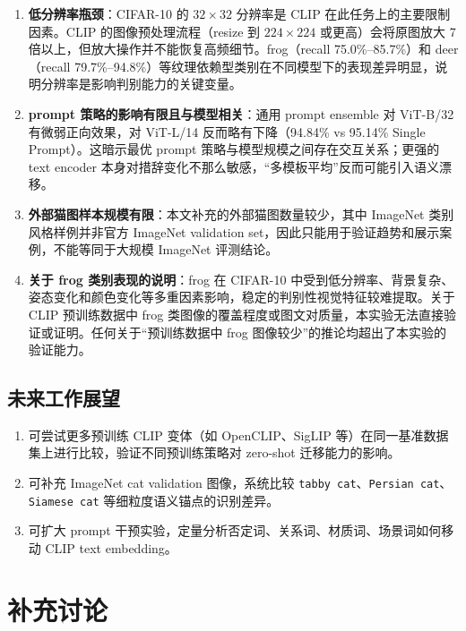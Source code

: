 \documentclass[12pt,a4paper]{ctexart}
\begin{document}
\begin{enumerate}
    \item \textbf{低分辨率瓶颈}：CIFAR-10 的 $32\times32$ 分辨率是 CLIP 在此任务上的主要限制因素。CLIP 的图像预处理流程（resize 到 $224\times224$ 或更高）会将原图放大 7 倍以上，但放大操作并不能恢复高频细节。frog（recall 75.0\%–85.7\%）和 deer（recall 79.7\%–94.8\%）等纹理依赖型类别在不同模型下的表现差异明显，说明分辨率是影响判别能力的关键变量。
    \item \textbf{prompt 策略的影响有限且与模型相关}：通用 prompt ensemble 对 ViT-B/32 有微弱正向效果，对 ViT-L/14 反而略有下降（94.84\% vs 95.14\% Single Prompt）。这暗示最优 prompt 策略与模型规模之间存在交互关系；更强的 text encoder 本身对措辞变化不那么敏感，“多模板平均”反而可能引入语义漂移。
    \item \textbf{外部猫图样本规模有限}：本文补充的外部猫图数量较少，其中 ImageNet 类别风格样例并非官方 ImageNet validation set，因此只能用于验证趋势和展示案例，不能等同于大规模 ImageNet 评测结论。
    \item \textbf{关于 frog 类别表现的说明}：frog 在 CIFAR-10 中受到低分辨率、背景复杂、姿态变化和颜色变化等多重因素影响，稳定的判别性视觉特征较难提取。关于 CLIP 预训练数据中 frog 类图像的覆盖程度或图文对质量，本实验无法直接验证或证明。任何关于“预训练数据中 frog 图像较少”的推论均超出了本实验的验证能力。
\end{enumerate}

\subsection{未来工作展望}

\begin{enumerate}
    \item 可尝试更多预训练 CLIP 变体（如 OpenCLIP、SigLIP 等）在同一基准数据集上进行比较，验证不同预训练策略对 zero-shot 迁移能力的影响。
    \item 可补充 ImageNet cat validation 图像，系统比较 \texttt{tabby cat}、\texttt{Persian cat}、\texttt{Siamese cat} 等细粒度语义锚点的识别差异。
    \item 可扩大 prompt 干预实验，定量分析否定词、关系词、材质词、场景词如何移动 CLIP text embedding。
\end{enumerate}

\section*{补充讨论}
\end{document}
